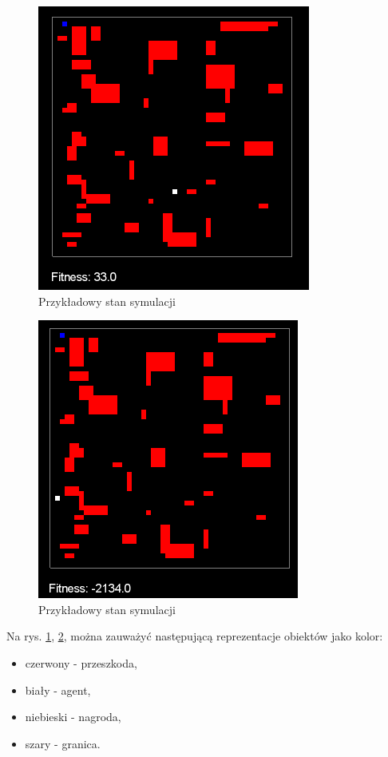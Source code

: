 \begin{figure}[h!]
    \centering
    \includegraphics[scale=0.4]{symulacja}
    \caption{Przykładowy stan symulacji}
    \label{fig:symulacja}
\end{figure}

\begin{figure}[h!]
    \centering
    \includegraphics[scale=0.4]{symulacja2}
    \caption{Przykładowy stan symulacji}
    \label{fig:symulacja2}
\end{figure}

Na rys. \ref{fig:symulacja}, \ref{fig:symulacja2}, można zauważyć następującą reprezentacje obiektów jako kolor:
\begin{itemize}
\renewcommand{\labelitemi}{$\bullet$}
 \item czerwony - przeszkoda,
 \item biały - agent,
 \item niebieski - nagroda,
 \item szary - granica.
\end{itemize}


